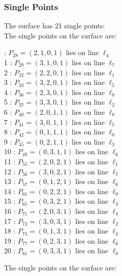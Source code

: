 \documentclass{article}
\begin{document}
{\subsubsection*{Single Points}
The surface has 21 single points:\\
The single points on the surface are:\\
\begin{multicols}{2}
 : $P_{28}=( 2, 1, 0, 1 )$ lies on line $\ell_{4}$\\
1 : $P_{29}=( 3, 1, 0, 1 )$ lies on line $\ell_{7}$\\
2 : $P_{32}=( 2, 2, 0, 1 )$ lies on line $\ell_{1}$\\
3 : $P_{33}=( 3, 2, 0, 1 )$ lies on line $\ell_{5}$\\
4 : $P_{36}=( 2, 3, 0, 1 )$ lies on line $\ell_{8}$\\
5 : $P_{37}=( 3, 3, 0, 1 )$ lies on line $\ell_{2}$\\
6 : $P_{40}=( 2, 0, 1, 1 )$ lies on line $\ell_{8}$\\
7 : $P_{41}=( 3, 0, 1, 1 )$ lies on line $\ell_{5}$\\
8 : $P_{42}=( 0, 1, 1, 1 )$ lies on line $\ell_{0}$\\
9 : $P_{45}=( 0, 2, 1, 1 )$ lies on line $\ell_{3}$\\
10 : $P_{49}=( 0, 3, 1, 1 )$ lies on line $\ell_{6}$\\
11 : $P_{55}=( 2, 0, 2, 1 )$ lies on line $\ell_{1}$\\
12 : $P_{56}=( 3, 0, 2, 1 )$ lies on line $\ell_{7}$\\
13 : $P_{57}=( 0, 1, 2, 1 )$ lies on line $\ell_{6}$\\
14 : $P_{61}=( 0, 2, 2, 1 )$ lies on line $\ell_{0}$\\
15 : $P_{65}=( 0, 3, 2, 1 )$ lies on line $\ell_{3}$\\
16 : $P_{71}=( 2, 0, 3, 1 )$ lies on line $\ell_{4}$\\
17 : $P_{72}=( 3, 0, 3, 1 )$ lies on line $\ell_{2}$\\
18 : $P_{73}=( 0, 1, 3, 1 )$ lies on line $\ell_{3}$\\
19 : $P_{77}=( 0, 2, 3, 1 )$ lies on line $\ell_{6}$\\
20 : $P_{81}=( 0, 3, 3, 1 )$ lies on line $\ell_{0}$\\
\end{multicols}
The single points on the surface are:\\
}
\end{document}
